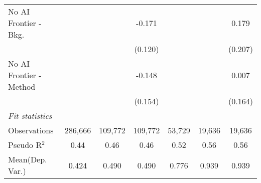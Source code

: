 \begin{tabular}{lcccccc}
   No AI Frontier - Bkg.   &         &         & -0.171       &         &         & 0.179\\   
                           &         &         & (0.120)      &         &         & (0.207)\\   
   No AI Frontier - Method &         &         & -0.148       &         &         & 0.007\\   
                           &         &         & (0.154)      &         &         & (0.164)\\   
   \midrule
   \emph{Fit statistics}\\
   Observations            & 286,666 & 109,772 & 109,772      & 53,729  & 19,636  & 19,636\\  
   Pseudo R$^2$            & 0.44    & 0.46    & 0.46         & 0.52    & 0.56    & 0.56\\  
Mean(Dep. Var.) & 0.424 & 0.490 & 0.490 & 0.776 & 0.939 & 0.939 \\
   

\end{tabular}
